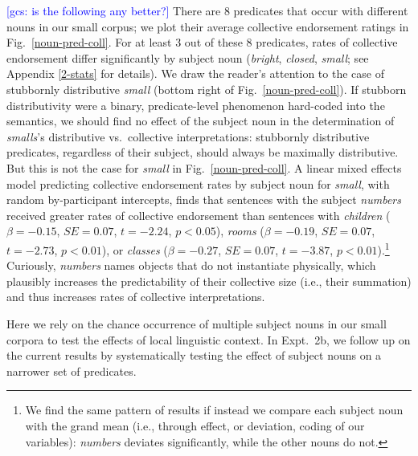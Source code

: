 \documentclass[linguex]{sp}
\newcommand{\ndg}[1]{\textcolor{Green}{[ndg: #1]}}
\newcommand{\gcs}[1]{\textcolor{blue}{[gcs: #1]}}
\begin{document}
\gcs{is the following any better?}
There are 8 predicates that occur with different nouns in our small corpus; we plot their average collective endorsement ratings in Fig.~\ref{noun-pred-coll}.
%
%
For at least 3 out of these 8 predicates, rates of collective endorsement differ significantly by subject noun (\emph{bright}, \emph{closed}, \emph{small}; see Appendix \ref{2-stats} for details). We draw the reader's attention to the case of stubbornly distributive \emph{small} (bottom right of Fig.~\ref{noun-pred-coll}). 
If stubborn distributivity were a binary, predicate-level phenomenon hard-coded into the semantics, we should find no effect of the subject noun in the determination of \emph{smalls}'s distributive vs.~collective interpretations: stubbornly distributive predicates, regardless of their subject, should always be maximally distributive. But this is not the case for \emph{small} in Fig.~\ref{noun-pred-coll}. 
A linear mixed effects model predicting collective endorsement rates by subject noun for \emph{small}, with random by-participant intercepts, finds that sentences with the subject \emph{numbers} received greater rates of collective endorsement than sentences with \emph{children} ($\beta=-0.15$, $SE=0.07$, $t=-2.24$, $p<0.05$), \emph{rooms} ($\beta=-0.19$, $SE=0.07$, $t=-2.73$, $p<0.01$), or \emph{classes} ($\beta=-0.27$, $SE=0.07$, $t=-3.87$, $p<0.01$).\footnote{We find the same pattern of results if instead we compare each subject noun with the grand mean (i.e., through effect, or deviation, coding of our variables): \emph{numbers} deviates significantly, while the other nouns do not.} Curiously, \emph{numbers} names objects that do not instantiate physically, which plausibly increases the predictability of their collective size (i.e., their summation) and thus increases rates of collective interpretations.

Here we rely on the chance occurrence of multiple subject nouns in our small corpora to test the effects of local linguistic context. In Expt.~2b, we follow up on the current results by systematically testing the effect of subject nouns on a narrower set of predicates.
\end{document}
